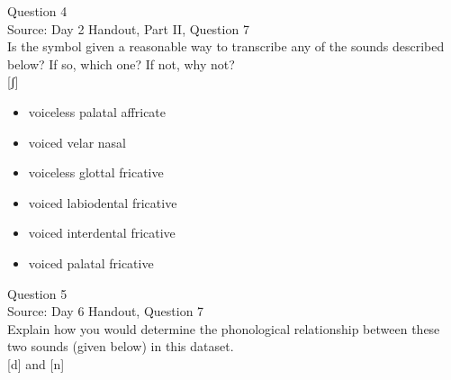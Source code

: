 \documentclass[12pt]{article}
\begin{document}
\newpage

{\large Question 4}\\

Source: Day 2 Handout, Part II, Question 7\\

Is the symbol given a reasonable way to transcribe any of the sounds described below? If so, which one? If not, why not?\\

{[ʃ]}

\begin{itemize} \item voiceless palatal affricate \item voiced velar nasal \item voiceless glottal fricative \item voiced labiodental fricative \item voiced interdental fricative \item voiced palatal fricative \end{itemize}


\newpage

{\large Question 5}\\

Source: Day 6 Handout, Question 7\\

Explain how you would determine the phonological relationship between these two sounds (given below) in this dataset.\\

{[d]} and {[n]}
\end{document}
